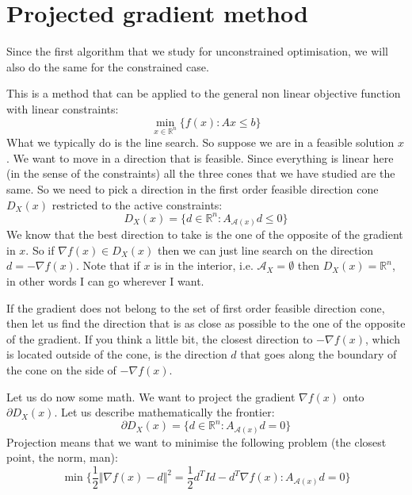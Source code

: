 \section{Projected gradient method}
\par Since the first algorithm that we study for unconstrained optimisation, we will also do the same for the constrained case.
\par This is a method that can be applied to the general non linear objective function with linear constraints:
\begin{equation}
    \min_{x \in \mathbb{R}^n}\{f(x) : Ax \leq b\}
\end{equation}
What we typically do is the line search. So suppose we are in a feasible solution $x$. We want to move in a direction that is feasible. Since everything is linear here (in the sense of the constraints) all the three cones that we have studied are the same. So we need to pick a direction in the first order feasible direction cone $D_X(x)$ restricted to the active constraints:
\begin{equation}
    D_X(x) = \{d \in \mathbb{R}^n : A_{\mathcal{A}(x)}d \leq 0\}    
\end{equation}
We know that the best direction to take is the one of the opposite of the gradient in $x$. So if $\nabla f(x) \in D_X(x)$ then we can just line search on the direction $d = - \nabla f(x)$. Note that if $x$ is in the interior, i.e. $\mathcal{A}_X = \emptyset$ then $D_X(x) = \mathbb{R}^n$, in other words I can go wherever I want.
\par If the gradient does not belong to the set of first order feasible direction cone, then let us find the direction that is as close as possible to the one of the opposite of the gradient. If you think a little bit, the closest direction to $-\nabla f(x)$, which is located outside of the cone, is the direction $d$ that goes along the boundary of the cone on the side of $-\nabla f(x)$.
\par Let us do now some math. We want to project the gradient $\nabla f(x)$ onto $\partial D_X(x)$. Let us describe mathematically the frontier:
\begin{equation}
    \partial D_X(x) = \{d \in \mathbb{R}^n : A_{\mathcal{A}(x)} d = 0\}
\end{equation}
Projection means that we want to minimise the following problem (the closest point, the norm, man):
\begin{equation}
    \min \Big\{\frac{1}{2}\Vert \nabla f(x) - d \Vert^2 = \frac{1}{2} d^T I d - d^T \nabla f(x) : A_{\mathcal{A}(x)}d = 0\Big\}
\end{equation}
